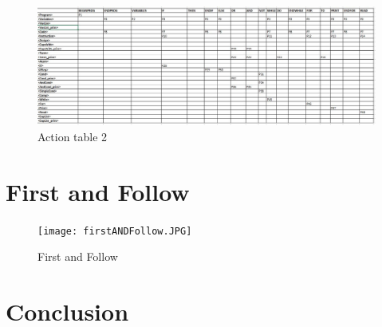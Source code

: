 \documentclass[12pt]{article}
\begin{document}
\begin{figure}[!h]
    \centering
    \includegraphics[height = 20 cm]{actionTable2.JPG}
    \caption{Action table 2}
    \label{fig:table2}
\end{figure}

\section {First and Follow}

\begin{figure}[H]
        \centering
        \texttt{[image: firstANDFollow.JPG]}
        \caption{First and Follow}
        \label{plot92}
\end{figure}


\section{Conclusion}
\end{document}
